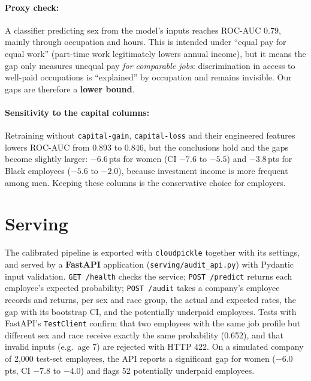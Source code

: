 \documentclass[11pt,a4paper]{article}
\newcommand{\pts}{\,pts\xspace}
\begin{document}
\paragraph{Proxy check:} A classifier predicting sex from the model's inputs reaches ROC-AUC 0.79, mainly through occupation and hours. This is intended under ``equal pay for equal work'' (part-time work legitimately lowers annual income), but it means the gap only measures unequal pay \emph{for comparable jobs}: discrimination in access to well-paid occupations is ``explained'' by occupation and remains invisible. Our gaps are therefore a \textbf{lower bound}.

\paragraph{Sensitivity to the capital columns:} Retraining without \texttt{capital-gain}, \texttt{capital-loss} and their engineered features lowers ROC-AUC from 0.893 to 0.846, but the conclusions hold and the gaps become slightly larger: $-6.6$\pts for women (CI $-7.6$ to $-5.5$) and $-3.8$\pts for Black employees ($-5.6$ to $-2.0$), because investment income is more frequent among men. Keeping these columns is the conservative choice for employers.

\section{Serving}

The calibrated pipeline is exported with \texttt{cloudpickle} together with its settings, and served by a \textbf{FastAPI} application (\texttt{serving/audit\_api.py}) with Pydantic input validation. \texttt{GET /health} checks the service; \texttt{POST /predict} returns each employee's expected probability; \texttt{POST /audit} takes a company's employee records and returns, per sex and race group, the actual and expected rates, the gap with its bootstrap CI, and the potentially underpaid employees. Tests with FastAPI's \texttt{TestClient} confirm that two employees with the same job profile but different sex and race receive exactly the same probability (0.652), and that invalid inputs (e.g.\ age 7) are rejected with HTTP 422. On a simulated company of 2{,}000 test-set employees, the API reports a significant gap for women ($-6.0$\pts, CI $-7.8$ to $-4.0$) and flags 52 potentially underpaid employees.
\end{document}
